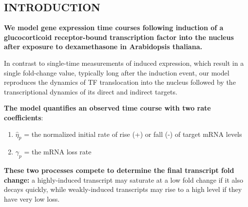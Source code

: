 \documentclass[aspb,landscape]{a0poster}
\begin{document}
\begin{multicols}{3} %

  \color{Black} %




  {
    \titlespacing{\section}{0pt}{0pt}{0pt}
    \section*{INTRODUCTION}

    \textbf{We model gene expression time courses following induction of a glucocorticoid receptor-bound transcription factor into the nucleus after exposure to dexamethasone in Arabidopsis thaliana.}
    
    In contrast to single-time measurements of induced expression, which result in a single fold-change value, typically long after the induction event,
    our model reproduces the dynamics of TF translocation into the nucleus followed by the transcriptional dynamics of its direct and indirect targets.
    
    \textbf{The model quantifies an observed time course with two rate coefficients}:
    \begin{enumerate}
    \item $\hat{\eta}_p$ = the normalized initial rate of rise (+) or fall (-) of target mRNA levels
    \item $\gamma_p$ = the mRNA loss rate
    \end{enumerate}
    \textbf{These two processes compete to determine the final transcript fold change:} a highly-induced transcript may saturate at a low fold change if it also decays quickly,
    while weakly-induced transcripts may rise to a high level if they have very low loss.
    
}
\end{multicols}
\end{document}

